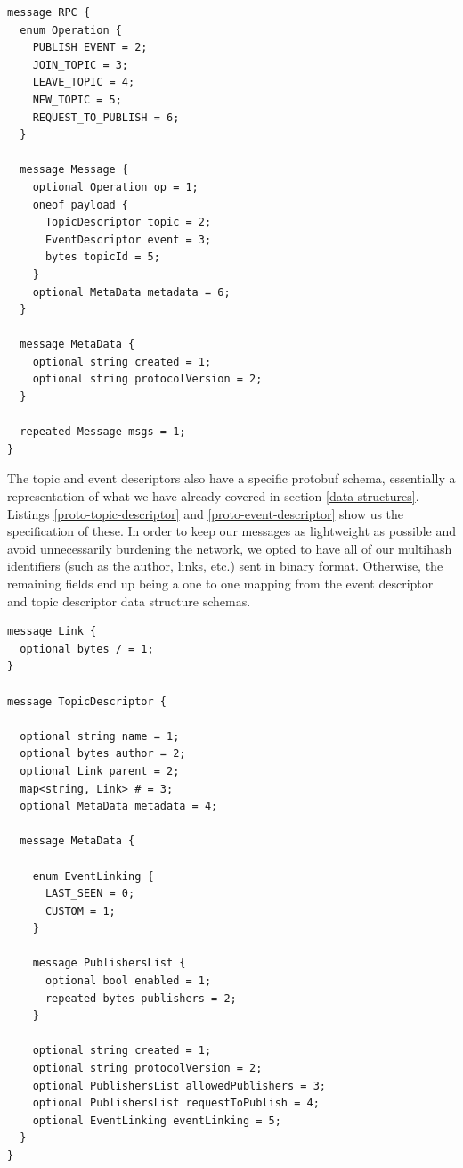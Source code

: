 \noindent\begin{minipage}{\textwidth}
\vspace{8pt}
\begin{lstlisting}[language=protobuf3,caption={Protobuf schema for our RPC messages},label={proto-rpc-message}]
message RPC {
  enum Operation {
    PUBLISH_EVENT = 2;
    JOIN_TOPIC = 3;
    LEAVE_TOPIC = 4;
    NEW_TOPIC = 5;
    REQUEST_TO_PUBLISH = 6;
  }

  message Message {
    optional Operation op = 1;
    oneof payload {
      TopicDescriptor topic = 2;
      EventDescriptor event = 3;
      bytes topicId = 5;
    }
    optional MetaData metadata = 6;
  }

  message MetaData {
    optional string created = 1;
    optional string protocolVersion = 2;
  }

  repeated Message msgs = 1;
}
\end{lstlisting}
\vspace{8pt}
\end{minipage}

The topic and event descriptors also have a specific protobuf schema,
essentially a representation of what we have already covered in section
\ref{data-structures}. Listings \ref{proto-topic-descriptor} and
\ref{proto-event-descriptor} show us the specification of these. In order to
keep our messages as lightweight as possible and avoid unnecessarily burdening
the network, we opted to have all of our multihash identifiers (such as the
author, links, etc.) sent in binary format. Otherwise, the remaining fields end
up being a one to one mapping from the event descriptor and topic descriptor
data structure schemas.

\noindent\begin{minipage}{\textwidth}
\vspace{8pt}
\begin{lstlisting}[language=protobuf3,caption={Protobuf schema of the topic descriptor},label={proto-topic-descriptor}]
message Link {
  optional bytes / = 1;
}

message TopicDescriptor {

  optional string name = 1;
  optional bytes author = 2;
  optional Link parent = 2;
  map<string, Link> # = 3;
  optional MetaData metadata = 4;

  message MetaData {

    enum EventLinking {
      LAST_SEEN = 0;
      CUSTOM = 1;
    }

    message PublishersList {
      optional bool enabled = 1;
      repeated bytes publishers = 2;
    }

    optional string created = 1;
    optional string protocolVersion = 2;
    optional PublishersList allowedPublishers = 3;
    optional PublishersList requestToPublish = 4;
    optional EventLinking eventLinking = 5;
  }
}
\end{lstlisting}
\vspace{8pt}
\end{minipage}

